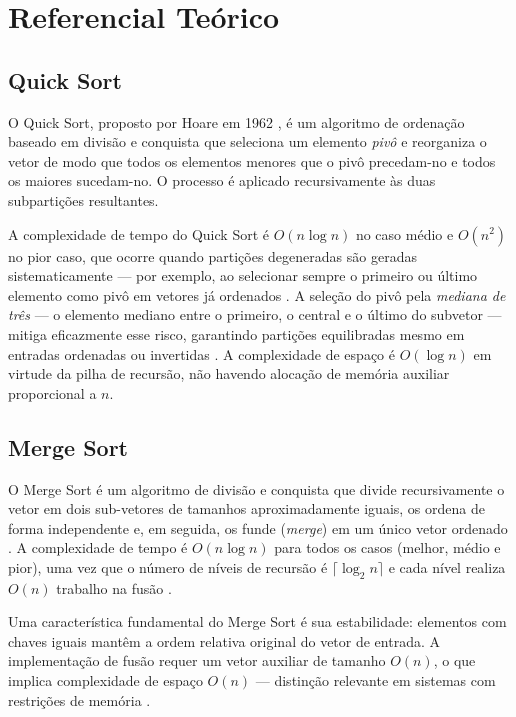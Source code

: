 \documentclass[12pt]{article}
\begin{document}
\section{Referencial Teórico}
\label{sec:theory}

\subsection{Quick Sort}

O Quick Sort, proposto por Hoare em 1962 \cite{hoare1962}, é um
algoritmo de ordenação baseado em divisão e conquista que seleciona
um elemento \textit{pivô} e reorganiza o vetor de modo que todos os
elementos menores que o pivô precedam-no e todos os maiores
sucedam-no. O processo é aplicado recursivamente às duas subpartições
resultantes.

A complexidade de tempo do Quick Sort é $O(n \log n)$ no caso médio
e $O(n^2)$ no pior caso, que ocorre quando partições degeneradas são
geradas sistematicamente --- por exemplo, ao selecionar sempre o
primeiro ou último elemento como pivô em vetores já ordenados
\cite{cormen2009}. A seleção do pivô pela \textit{mediana de três}
--- o elemento mediano entre o primeiro, o central e o último do
subvetor --- mitiga eficazmente esse risco, garantindo partições
equilibradas mesmo em entradas ordenadas ou invertidas \cite{sedgewick2011}.
A complexidade de espaço é $O(\log n)$ em virtude da pilha de
recursão, não havendo alocação de memória auxiliar proporcional a $n$.

\subsection{Merge Sort}

O Merge Sort é um algoritmo de divisão e conquista que divide
recursivamente o vetor em dois sub-vetores de tamanhos aproximadamente
iguais, os ordena de forma independente e, em seguida, os funde
(\textit{merge}) em um único vetor ordenado \cite{cormen2009}.
A complexidade de tempo é $O(n \log n)$ para todos os casos (melhor,
médio e pior), uma vez que o número de níveis de recursão é
$\lceil \log_2 n \rceil$ e cada nível realiza $O(n)$ trabalho na
fusão \cite{knuth1998}.

Uma característica fundamental do Merge Sort é sua estabilidade:
elementos com chaves iguais mantêm a ordem relativa original do
vetor de entrada. A implementação de fusão requer um vetor auxiliar
de tamanho $O(n)$, o que implica complexidade de espaço $O(n)$
--- distinção relevante em sistemas com restrições de memória
\cite{goodrich2014}.
\end{document}
